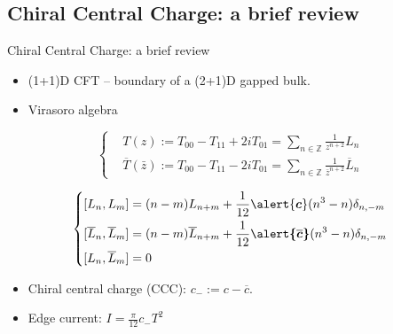 \documentclass[professionalfont]{beamer}
\begin{document}
\subsection{Chiral Central Charge: a brief review}
\begin{frame}{Chiral Central Charge: a brief review}

\begin{itemize}
    \item (1+1)D CFT -- boundary of a (2+1)D gapped bulk.
        
    \item Virasoro algebra
\end{itemize}
\vspace{-0.5cm}
        {\tiny
            \begin{figure}
                \centering
                \begin{minipage}{0.45\linewidth}
                    \[
                    \left\{
                    \begin{aligned}
                        & T(z) := T_{00} - T_{11} + 2iT_{01} = \sum_{n\in\mathbb{Z}}\frac{1}{z^{n+2}}L_n\\
                        & \overline{T}(\bar{z}):= T_{00} - T_{11} - 2iT_{01} = \sum_{n\in\mathbb{Z}}\frac{1}{\bar{z}^{n+2}}\overline{L}_n
                    \end{aligned}
                    \right.
                    \]
                \end{minipage}
                \begin{minipage}{0.45\linewidth}
                    \[\left\{
                    \begin{aligned}
                    & [L_n,L_m] = (n-m)L_{n+m}+\frac{1}{12}\alert{\boldsymbol{c}}(n^3-n)\delta_{n,-m} \\
                    & [\overline{L}_n,\overline{L}_m] = (n-m)\overline{L}_{n+m}+\frac{1}{12}\boldsymbol{\alert{\overline{c}}}(n^3-n)\delta_{n,-m} \\
                    & [L_n,\overline{L}_m]=0
                    \end{aligned}
                    \right.\]
                \end{minipage}
            \end{figure}
        }

\begin{itemize}
    \item Chiral central charge (CCC): $c_-:=c-\overline{c}$.
    \item Edge current: $I = \frac{\pi}{12}c_- T^2$
\end{itemize}


\end{frame}
\end{document}
